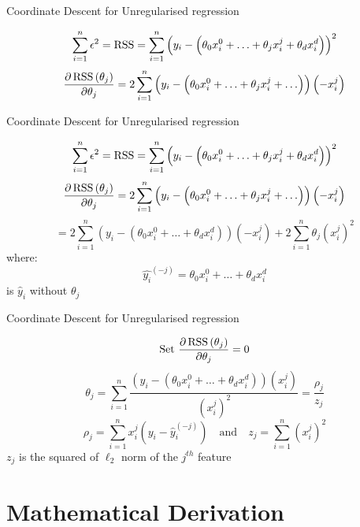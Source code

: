 \documentclass{beamer}
\begin{document}
\begin{frame}{Coordinate Descent for Unregularised regression}

\[
\sum_{i=1}^{n}  \epsilon^{2}=\operatorname{RSS} =\sum_{i=1}^{n}\left(y_{i}-\left(\theta_{0}x_{i}^{0}+\ldots + \theta_{j} x_{i}^{j}+\theta_{d} x_{i}^{d}\right)\right)^{2}
\]
\[
\frac{\partial \operatorname{RSS}\left(\theta_{j}\right)}{\partial \theta_{j}}= 2 \sum_{i=1}^{n}\left(y_{i}-\left(\theta_{0}x_{i}^{0}+\ldots + \theta_{j} x_{i}^{j}+\ldots \right)\right)\left(-x_{i}^{j}\right)
\]
\end{frame}

\begin{frame}{Coordinate Descent for Unregularised regression}

\[
\sum_{i=1}^{n}  \epsilon^{2}=\operatorname{RSS} =\sum_{i=1}^{n}\left(y_{i}-\left(\theta_{0}x_{i}^{0}+\ldots + \theta_{j} x_{i}^{j}+\theta_{d} x_{i}^{d}\right)\right)^{2}
\]
\[
\frac{\partial \operatorname{RSS}\left(\theta_{j}\right)}{\partial \theta_{j}}= 2 \sum_{i=1}^{n}\left(y_{i}-\left(\theta_{0}x_{i}^{0}+\ldots + \theta_{j} x_{i}^{j}+\ldots \right)\right)\left(-x_{i}^{j}\right)
\]
\[
=2\sum_{i=1}^{n}\left(y_{i}-\left(\theta_{0} x_{i}^{0}+\ldots + \theta_{d} x_{i}^{d}\right)\right)\left(-x_{i}^{j}\right)+2 \sum_{i=1}^{n} \theta_{j}(x_{i}^j)^2
\]
\pause where: $$\hat{y_{i}}^{(-j)} = \theta_{0} x_{i}^{0}+\ldots + \theta_{d} x_{i}^{d}$$ is $\hat{y}_{i}$ without $\theta_{j}$
\end{frame}

\begin{frame}{Coordinate Descent for Unregularised regression}

\[
\text{Set } \frac{\partial \operatorname{RSS}\left(\theta_{j}\right)}{\partial \theta_{j}}= 0
\]
\[
\theta_{j}=\sum_{i=1}^{n} \frac{\left(y_{i}-\left(\theta_{0} x_{i}^{0}+\ldots + \theta_{d} x_{i}^{d}\right)\right)\left(x_{i}^{j}\right)}{\left(x_{i}^{j}\right)^{2}}= \frac{\rho_{j}}{z_{j}}
\]
\[
\rho_{j} =\sum_{i=1}^{n} x_{i}^{j}\left(y_{i}-{\hat{y}_{i}^{(-j)}}\right) \quad \text{and} \quad z_{j}=\sum_{i=1}^{n}\left(x_{i}^{j}\right)^{2}
\]
$z_{j}$ is the squared of $\ell_2$ norm of the $j^{th}$ feature
\end{frame}

%




\section{Mathematical Derivation}
\end{document}
